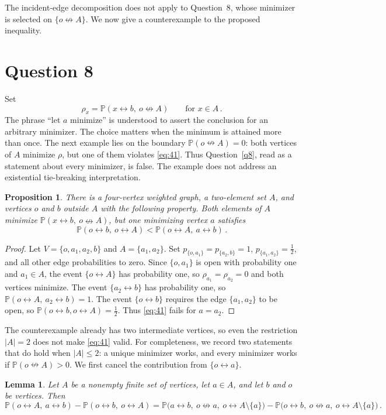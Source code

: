 \documentclass[11pt]{article}
\newtheorem{lemma}[theorem]{Lemma}
\newtheorem{proposition}[theorem]{Proposition}
\theoremstyle{definition}
\theoremstyle{remark}
\newcommand{\PP}{\mathbb P}
\newcommand{\con}{\leftrightarrow}
\newcommand{\ncon}{\nleftrightarrow}
\begin{document}
The incident-edge decomposition does not apply to Question~8, whose minimizer is selected
on $\{o\ncon A\}$. We now give a counterexample to the proposed inequality.

\section{Question 8}\label{sec:q8}

Set
\[
 \rho_x=\PP(x\con b,\ o\ncon A)\qquad\text{for } x\in A\,.
\]
The phrase ``let $a$ minimize'' is understood to assert the conclusion for an
arbitrary minimizer. The choice matters when the minimum is attained more than once. The next
example lies on the boundary $\PP(o\ncon A)=0$: both vertices of $A$ minimize $\rho$, but
one of them violates \eqref{eq:41}. Thus Question~\ref{q8}, read as a statement about every
minimizer, is false. The example does not address an existential tie-breaking
interpretation.

\begin{proposition}\label{prop:q8}
There is a four-vertex weighted graph, a two-element set $A$, and vertices $o$ and $b$
outside $A$ with the following property. Both elements of $A$ minimize
$\PP(x\con b,\ o\ncon A)$, but one minimizing vertex $a$ satisfies
\[
 \PP(o\con b,\ o\con A)<\PP(o\con A,\ a\con b)\,.
\]
\end{proposition}

\begin{proof}
Let $V=\{o,a_1,a_2,b\}$ and $A=\{a_1,a_2\}$. Set
$p_{\{o,a_1\}}=p_{\{a_2,b\}}=1$, $p_{\{a_1,a_2\}}=\tfrac12$, and all other edge
probabilities to zero. Since $\{o,a_1\}$ is open with probability one and $a_1\in A$, the event $\{o\con A\}$
has probability one, so $\rho_{a_1}=\rho_{a_2}=0$ and both vertices minimize. The event
$\{a_2\con b\}$ has probability one, so $\PP(o\con A,\ a_2\con b)=1$. The event $\{o\con
b\}$ requires the edge $\{a_1,a_2\}$ to be open, so $\PP(o\con b,o\con A)=\tfrac12$. Thus
\eqref{eq:41} fails for $a=a_2$.
\end{proof}

The counterexample already has two intermediate vertices, so even the restriction
$|A|=2$ does not make \eqref{eq:41} valid. For completeness, we record two statements that
do hold when $|A|\leq2$: a unique minimizer works, and every minimizer works if
$\PP(o\ncon A)>0$. We first cancel the contribution from $\{o\con a\}$.

\begin{lemma}\label{lem:cancel}
Let $A$ be a nonempty finite set of vertices, let $a\in A$, and let $b$ and $o$ be
vertices. Then
\[
 \PP(o\con A,\ a\con b)-\PP(o\con b,\ o\con A)
 =\PP\bigl(a\con b,\ o\ncon a,\ o\con A\setminus\{a\}\bigr)
 -\PP\bigl(o\con b,\ o\ncon a,\ o\con A\setminus\{a\}\bigr)\,.
\]
\end{lemma}
\end{document}
